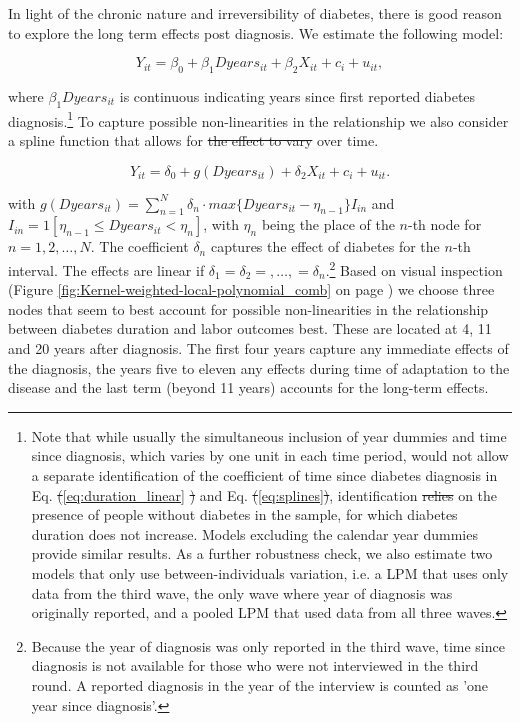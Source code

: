 \documentclass[12pt,english]{article}
\providecommand{\DIFaddtex}[1]{{\protect\color{blue}\uwave{#1}}} %
\providecommand{\DIFdeltex}[1]{{\protect\color{red}\sout{#1}}}                      %
\providecommand{\DIFaddbegin}{} %
\providecommand{\DIFaddend}{} %
\providecommand{\DIFdelbegin}{} %
\providecommand{\DIFdelend}{} %
\providecommand{\DIFadd}[1]{\texorpdfstring{\DIFaddtex{#1}}{#1}} %
\providecommand{\DIFdel}[1]{\texorpdfstring{\DIFdeltex{#1}}{}} %
\begin{document}
In light of the chronic nature and irreversibility of diabetes, there is good reason to explore the long term effects post diagnosis.  We estimate the following model:

\begin{equation}
Y_{it}=\beta_{0}+\beta_{1}Dyears_{it}+\beta_{2}X_{it}+c_{i}+u_{it},\label{eq:duration_linear}
\end{equation}

\DIFdelbegin %
\DIFdelend where $\beta_{1}Dyears_{it}$ is continuous indicating years since first reported diabetes diagnosis.\footnote{Note that while usually the simultaneous inclusion of year dummies and time since diagnosis, which varies by one unit in each time period, would not allow a separate identification of the coefficient of time since diabetes diagnosis in Eq. \DIFdelbegin \DIFdel{(}\DIFdelend \ref{eq:duration_linear} \DIFdelbegin \DIFdel{) }\DIFdelend and Eq.  \DIFdelbegin \DIFdel{(}\DIFdelend \ref{eq:splines}\DIFdelbegin \DIFdel{)}\DIFdelend , identification \DIFdelbegin \DIFdel{relies }\DIFdelend \DIFaddbegin \DIFadd{has to rely }\DIFaddend on the presence of people without diabetes in the sample, for which diabetes duration does not increase.  Models excluding the calendar year dummies provide similar results.  As a further robustness check, we also estimate two models that only use between-individuals variation, i.e. a \ac{LPM} that uses only data from the third wave, the only wave where year of diagnosis was originally reported, and a pooled \ac{LPM} that used data from all three waves.} To capture possible non-linearities in the relationship we also consider a spline function that allows for \DIFdelbegin \DIFdel{the effect to vary }\DIFdelend \DIFaddbegin \DIFadd{non-linear effects }\DIFaddend over time.

\begin{equation}
Y_{it}=\delta_{0}+g(Dyears_{it})+\delta_{2}X_{it}+c_{i}+u_{it}.\label{eq:splines}
\end{equation}

\noindent with $g(Dyears_{it})=\sum_{n=1}^{N}\delta_{n}\cdot max\{Dyears_{it}-\eta_{n-1}\}I_{in}$ and $I_{in}=1[\eta_{n-1}\leq Dyears_{it}<\eta_{n}]$, with $\eta_{n}$ being the place of the $n$-th node for $n=1,2,\ldots,N$. The coefficient $\delta_{n}$ captures the effect of diabetes for the $n$-th interval. The effects are linear if $\delta_{1}=\delta_{2}=,\ldots,=\delta_{n}$.\footnote{Because the year of diagnosis was only reported in the third wave, time since diagnosis is not available for those who were not interviewed in the third round.  A reported diagnosis in the year of the interview is counted as 'one year since diagnosis'.} Based on visual inspection (Figure \ref{fig:Kernel-weighted-local-polynomial_comb} on page \pageref{fig:Kernel-weighted-local-polynomial_comb}) we choose three nodes that seem to best account for possible non-linearities in the relationship between diabetes duration and labor outcomes best. These are located at 4, 11 and 20 years after diagnosis. The first four years capture any immediate effects of the diagnosis, the years five to eleven any effects during time of adaptation to the disease and the last term (beyond 11 years) accounts for the long-term effects.
\end{document}

